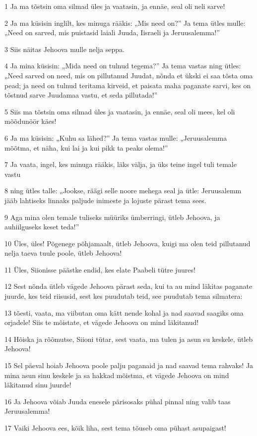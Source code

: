 \par 1 Ja ma tõstsin oma silmad üles ja vaatasin, ja ennäe, seal oli neli sarve!
\par 2 Ja ma küsisin inglilt, kes minuga rääkis: „Mis need on?” Ja tema ütles mulle: „Need on sarved, mis puistasid laiali Juuda, Iisraeli ja Jeruusalemma!”
\par 3 Siis näitas Jehoova mulle nelja seppa.
\par 4 Ja mina küsisin: „Mida need on tulnud tegema?” Ja tema vastas ning ütles: „Need sarved on need, mis on pillutanud Juudat, nõnda et ükski ei saa tõsta oma pead; ja need on tulnud teritama kirveid, et paisata maha paganate sarvi, kes on tõstnud sarve Juudamaa vastu, et seda pillutada!”
\par 5 Siis ma tõstsin oma silmad üles ja vaatasin, ja ennäe, seal oli mees, kel oli mõõdunöör käes!
\par 6 Ja ma küsisin: „Kuhu sa lähed?” Ja tema vastas mulle: „Jeruusalemma mõõtma, et näha, kui lai ja kui pikk ta peaks olema!”
\par 7 Ja vaata, ingel, kes minuga rääkis, läks välja, ja üks teine ingel tuli temale vastu
\par 8 ning ütles talle: „Jookse, räägi selle noore mehega seal ja ütle: Jeruusalemm jääb lahtiseks linnaks paljude inimeste ja lojuste pärast tema sees.
\par 9 Aga mina olen temale tuliseks müüriks ümberringi, ütleb Jehoova, ja auhiilguseks keset teda!”
\par 10 Üles, üles! Põgenege põhjamaalt, ütleb Jehoova, kuigi ma olen teid pillutanud nelja taeva tuule poole, ütleb Jehoova!
\par 11 Üles, Siionisse päästke endid, kes elate Paabeli tütre juures!
\par 12 Sest nõnda ütleb vägede Jehoova pärast seda, kui ta au mind läkitas paganate juurde, kes teid riisusid, sest kes puudutab teid, see puudutab tema silmatera:
\par 13 tõesti, vaata, ma viibutan oma kätt nende kohal ja nad saavad saagiks oma orjadele! Siis te mõistate, et vägede Jehoova on mind läkitanud!
\par 14 Hõiska ja rõõmutse, Siioni tütar, sest vaata, ma tulen ja asun su keskele, ütleb Jehoova!
\par 15 Sel päeval hoiab Jehoova poole palju paganaid ja nad saavad tema rahvaks! Ja mina asun sinu keskele ja sa hakkad mõistma, et vägede Jehoova on mind läkitanud sinu juurde!
\par 16 Ja Jehoova võiab Juuda enesele pärisosaks pühal pinnal ning valib taas Jeruusalemma!
\par 17 Vaiki Jehoova ees, kõik liha, sest tema tõuseb oma pühast asupaigast!


